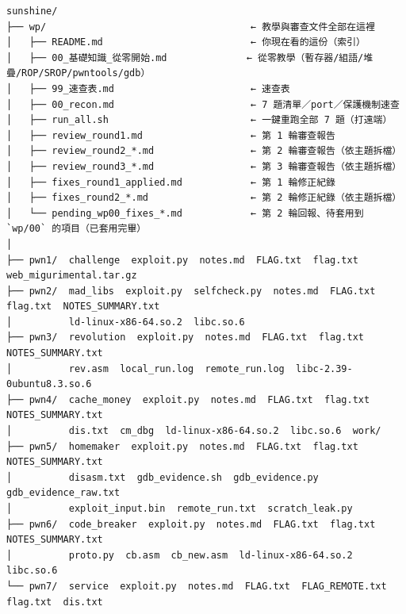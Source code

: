 \documentclass[10pt,a4paper]{article}
\begin{document}
\begin{Verbatim}[breaklines=true,breakanywhere=true,breakautoindent=false,fontsize=\fontsize{7.0}{9.5}\selectfont]
sunshine/
├── wp/                                    ← 教學與審查文件全部在這裡
│   ├── README.md                          ← 你現在看的這份（索引）
│   ├── 00_基礎知識_從零開始.md              ← 從零教學（暫存器/組語/堆疊/ROP/SROP/pwntools/gdb）
│   ├── 99_速查表.md                        ← 速查表
│   ├── 00_recon.md                        ← 7 題清單／port／保護機制速查
│   ├── run_all.sh                         ← 一鍵重跑全部 7 題（打遠端）
│   ├── review_round1.md                   ← 第 1 輪審查報告
│   ├── review_round2_*.md                 ← 第 2 輪審查報告（依主題拆檔）
│   ├── review_round3_*.md                 ← 第 3 輪審查報告（依主題拆檔）
│   ├── fixes_round1_applied.md            ← 第 1 輪修正紀錄
│   ├── fixes_round2_*.md                  ← 第 2 輪修正紀錄（依主題拆檔）
│   └── pending_wp00_fixes_*.md            ← 第 2 輪回報、待套用到 `wp/00` 的項目（已套用完畢）
│
├── pwn1/  challenge  exploit.py  notes.md  FLAG.txt  flag.txt  web_migurimental.tar.gz
├── pwn2/  mad_libs  exploit.py  selfcheck.py  notes.md  FLAG.txt  flag.txt  NOTES_SUMMARY.txt
│          ld-linux-x86-64.so.2  libc.so.6
├── pwn3/  revolution  exploit.py  notes.md  FLAG.txt  flag.txt  NOTES_SUMMARY.txt
│          rev.asm  local_run.log  remote_run.log  libc-2.39-0ubuntu8.3.so.6
├── pwn4/  cache_money  exploit.py  notes.md  FLAG.txt  flag.txt  NOTES_SUMMARY.txt
│          dis.txt  cm_dbg  ld-linux-x86-64.so.2  libc.so.6  work/
├── pwn5/  homemaker  exploit.py  notes.md  FLAG.txt  flag.txt  NOTES_SUMMARY.txt
│          disasm.txt  gdb_evidence.sh  gdb_evidence.py  gdb_evidence_raw.txt
│          exploit_input.bin  remote_run.txt  scratch_leak.py
├── pwn6/  code_breaker  exploit.py  notes.md  FLAG.txt  flag.txt  NOTES_SUMMARY.txt
│          proto.py  cb.asm  cb_new.asm  ld-linux-x86-64.so.2  libc.so.6
└── pwn7/  service  exploit.py  notes.md  FLAG.txt  FLAG_REMOTE.txt  flag.txt  dis.txt
\end{Verbatim}
\end{document}
